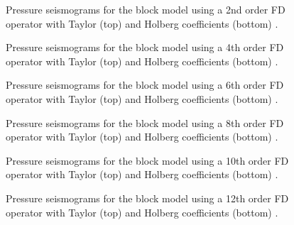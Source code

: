 \documentclass[11pt,onecolumn,oneside]{article}
\begin{document}
\begin{figure}[ht]
\begin{center}
\caption{\label{Taylor_Holberg_2nd_comp.pdf} Pressure seismograms for the block model using a 2nd order FD operator with Taylor (top) and Holberg coefficients (bottom) .}
\end{center}
\end{figure}
\begin{figure}[ht]
\begin{center}
\caption{\label{Taylor_Holberg_4th_comp.pdf} Pressure seismograms for the block model using a 4th order FD operator with Taylor (top) and Holberg coefficients (bottom) .}
\end{center}
\end{figure}
\begin{figure}[ht]
\begin{center}
\caption{\label{Taylor_Holberg_6th_comp.pdf} Pressure seismograms for the block model using a 6th order FD operator with Taylor (top) and Holberg coefficients (bottom) .}
\end{center}
\end{figure}
\begin{figure}[ht]
\begin{center}
\caption{\label{Taylor_Holberg_8th_comp.pdf} Pressure seismograms for the block model using a 8th order FD operator with Taylor (top) and Holberg coefficients (bottom) .}
\end{center}
\end{figure}
\begin{figure}[ht]
\begin{center}
\caption{\label{Taylor_Holberg_10th_comp.pdf} Pressure seismograms for the block model using a 10th order FD operator with Taylor (top) and Holberg coefficients (bottom) .}
\end{center}
\end{figure}
\begin{figure}[ht]
\begin{center}
\caption{\label{Taylor_Holberg_12th_comp.pdf} Pressure seismograms for the block model using a 12th order FD operator with Taylor (top) and Holberg coefficients (bottom) .}
\end{center}
\end{figure}
\clearpage
\end{document}
